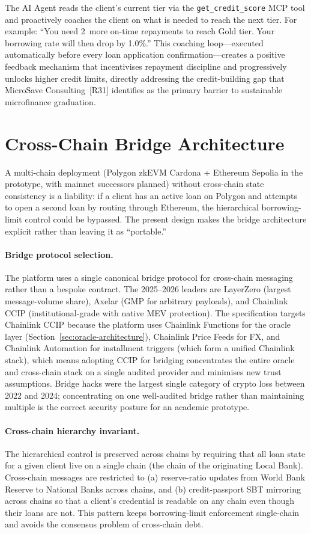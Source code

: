 \documentclass[12pt,a4paper]{report}
\begin{document}
The AI Agent reads the client's current tier via the \texttt{get\_credit\_score} MCP tool and proactively coaches the client on what is needed to reach the next tier. For example: ``You need 2~more on-time repayments to reach Gold tier. Your borrowing rate will then drop by 1.0\%.'' This coaching loop---executed automatically before every loan application confirmation---creates a positive feedback mechanism that incentivises repayment discipline and progressively unlocks higher credit limits, directly addressing the credit-building gap that MicroSave Consulting~[R31] identifies as the primary barrier to sustainable microfinance graduation.

\section{Cross-Chain Bridge Architecture}
\label{sec:bridge}

A multi-chain deployment (Polygon zkEVM Cardona + Ethereum Sepolia in the prototype, with mainnet successors planned) without cross-chain state consistency is a liability: if a client has an active loan on Polygon and attempts to open a second loan by routing through Ethereum, the hierarchical borrowing-limit control could be bypassed. The present design makes the bridge architecture explicit rather than leaving it as ``portable.''

\paragraph{Bridge protocol selection.}
The platform uses a single canonical bridge protocol for cross-chain messaging rather than a bespoke contract. The 2025--2026 leaders are LayerZero (largest message-volume share), Axelar (GMP for arbitrary payloads), and Chainlink CCIP (institutional-grade with native MEV protection). The specification targets Chainlink CCIP because the platform uses Chainlink Functions for the oracle layer (Section~\ref{sec:oracle-architecture}), Chainlink Price Feeds for FX, and Chainlink Automation for installment triggers (which form a unified Chainlink stack), which means adopting CCIP for bridging concentrates the entire oracle and cross-chain stack on a single audited provider and minimises new trust assumptions. Bridge hacks were the largest single category of crypto loss between 2022 and 2024; concentrating on one well-audited bridge rather than maintaining multiple is the correct security posture for an academic prototype.

\paragraph{Cross-chain hierarchy invariant.}
The hierarchical control is preserved across chains by requiring that all loan state for a given client live on a single chain (the chain of the originating Local Bank). Cross-chain messages are restricted to (a) reserve-ratio updates from World Bank Reserve to National Banks across chains, and (b) credit-passport SBT mirroring across chains so that a client's credential is readable on any chain even though their loans are not. This pattern keeps borrowing-limit enforcement single-chain and avoids the consensus problem of cross-chain debt.
\end{document}
